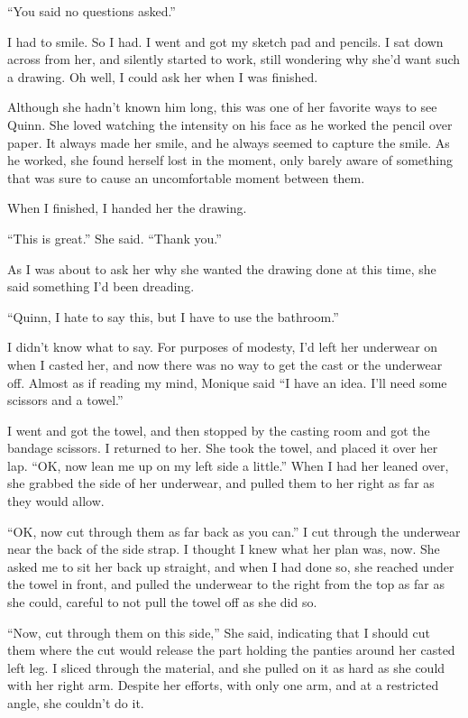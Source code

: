 ``You said no questions asked.''

I had to smile. So I had. I went and got my sketch pad and pencils. I sat down across from
her, and silently started to work, still wondering why she'd want such a drawing. Oh well, I
could ask her when I was finished.

\begin{thought}
Although she hadn't known him long, this was one of her favorite ways to see Quinn. She
loved watching the intensity on his face as he worked the pencil over paper. It always made her
smile, and he always seemed to capture the smile. As he worked, she found herself lost in the
moment, only barely aware of something that was sure to cause an uncomfortable moment between
them.
\end{thought}

When I finished, I handed her the drawing.

``This is great.'' She said. ``Thank you.''

As I was about to ask her why she wanted the drawing done at this time, she said something
I'd been dreading.

``Quinn, I hate to say this, but I have to use the bathroom.''

I didn't know what to say. For purposes of modesty, I'd left her underwear on when I casted
her, and now there was no way to get the cast or the underwear off. Almost as if reading my
mind, Monique said ``I have an idea. I'll need some scissors and a towel.''

I went and got the towel, and then stopped by the casting room and got the bandage
scissors. I returned to her. She took the towel, and placed it over her lap. ``OK, now lean me
up on my left side a little.'' When I had her leaned over, she grabbed the side of her
underwear, and pulled them to her right as far as they would allow.

``OK, now cut through them as far back as you can.'' I cut through the underwear near the
back of the side strap. I thought I knew what her plan was, now. She asked me to sit her back up
straight, and when I had done so, she reached under the towel in front, and pulled the underwear
to the right from the top as far as she could, careful to not pull the towel off as she did so.

``Now, cut through them on this side,'' She said, indicating that I should cut them where
the cut would release the part holding the panties around her casted left leg. I sliced through
the material, and she pulled on it as hard as she could with her right arm. Despite her efforts,
with only one arm, and at a restricted angle, she couldn't do it.


